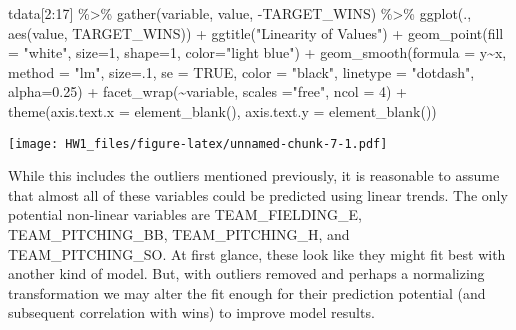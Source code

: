 \documentclass[
]{article}
\newenvironment{Shaded}{\begin{snugshade}}{\end{snugshade}}
\newcommand{\AttributeTok}[1]{\textcolor[rgb]{0.77,0.63,0.00}{#1}}
\newcommand{\ConstantTok}[1]{\textcolor[rgb]{0.00,0.00,0.00}{#1}}
\newcommand{\DecValTok}[1]{\textcolor[rgb]{0.00,0.00,0.81}{#1}}
\newcommand{\FloatTok}[1]{\textcolor[rgb]{0.00,0.00,0.81}{#1}}
\newcommand{\FunctionTok}[1]{\textcolor[rgb]{0.00,0.00,0.00}{#1}}
\newcommand{\NormalTok}[1]{#1}
\newcommand{\SpecialCharTok}[1]{\textcolor[rgb]{0.00,0.00,0.00}{#1}}
\newcommand{\StringTok}[1]{\textcolor[rgb]{0.31,0.60,0.02}{#1}}
\begin{document}
\begin{Shaded}
\begin{Highlighting}[]
\NormalTok{tdata[}\DecValTok{2}\SpecialCharTok{:}\DecValTok{17}\NormalTok{]  }\SpecialCharTok{\%\textgreater{}\%}
  \FunctionTok{gather}\NormalTok{(variable, value, }\SpecialCharTok{{-}}\NormalTok{TARGET\_WINS) }\SpecialCharTok{\%\textgreater{}\%} 
  \FunctionTok{ggplot}\NormalTok{(., }\FunctionTok{aes}\NormalTok{(value, TARGET\_WINS)) }\SpecialCharTok{+} 
  \FunctionTok{ggtitle}\NormalTok{(}\StringTok{"Linearity of Values"}\NormalTok{) }\SpecialCharTok{+} 
  \FunctionTok{geom\_point}\NormalTok{(}\AttributeTok{fill =} \StringTok{"white"}\NormalTok{,}
             \AttributeTok{size=}\DecValTok{1}\NormalTok{, }
             \AttributeTok{shape=}\DecValTok{1}\NormalTok{, }
             \AttributeTok{color=}\StringTok{"light blue"}\NormalTok{) }\SpecialCharTok{+} 
  \FunctionTok{geom\_smooth}\NormalTok{(}\AttributeTok{formula =}\NormalTok{ y}\SpecialCharTok{\textasciitilde{}}\NormalTok{x, }
              \AttributeTok{method =} \StringTok{"lm"}\NormalTok{, }
              \AttributeTok{size=}\NormalTok{.}\DecValTok{1}\NormalTok{,}
              \AttributeTok{se =} \ConstantTok{TRUE}\NormalTok{,}
              \AttributeTok{color =} \StringTok{"black"}\NormalTok{, }
              \AttributeTok{linetype =} \StringTok{"dotdash"}\NormalTok{, }
              \AttributeTok{alpha=}\FloatTok{0.25}\NormalTok{) }\SpecialCharTok{+} 
  \FunctionTok{facet\_wrap}\NormalTok{(}\SpecialCharTok{\textasciitilde{}}\NormalTok{variable, }
             \AttributeTok{scales =}\StringTok{"free"}\NormalTok{,}
             \AttributeTok{ncol =} \DecValTok{4}\NormalTok{) }\SpecialCharTok{+}
  \FunctionTok{theme}\NormalTok{(}\AttributeTok{axis.text.x =} \FunctionTok{element\_blank}\NormalTok{(), }\AttributeTok{axis.text.y =} \FunctionTok{element\_blank}\NormalTok{())}
\end{Highlighting}
\end{Shaded}

\texttt{[image: HW1\_files/figure-latex/unnamed-chunk-7-1.pdf]}

While this includes the outliers mentioned previously, it is reasonable
to assume that almost all of these variables could be predicted using
linear trends. The only potential non-linear variables are
TEAM\_FIELDING\_E, TEAM\_PITCHING\_BB, TEAM\_PITCHING\_H, and
TEAM\_PITCHING\_SO. At first glance, these look like they might fit best
with another kind of model. But, with outliers removed and perhaps a
normalizing transformation we may alter the fit enough for their
prediction potential (and subsequent correlation with wins) to improve
model results.
\end{document}
